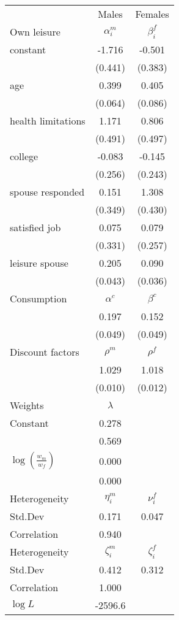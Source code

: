 \begin{tabular}{lcc} 
\hline\hline 
 & Males & Females \\ 
Own leisure & $\alpha_{i}^{m}$ & $\beta_{i}^{f}$ \\ 
constant & -1.716 & -0.501 \\ 
 & (0.441) & (0.383) \\ 
age & 0.399 & 0.405 \\ 
 & (0.064) & (0.086) \\ 
health limitations & 1.171 & 0.806 \\ 
 & (0.491) & (0.497) \\ 
college & -0.083 & -0.145 \\ 
 & (0.256) & (0.243) \\ 
spouse responded & 0.151 & 1.308 \\ 
 & (0.349) & (0.430) \\ 
satisfied job & 0.075 & 0.079 \\ 
 & (0.331) & (0.257) \\ 
leisure spouse & 0.205 & 0.090 \\ 
 & (0.043) & (0.036) \\ 
Consumption & $\alpha^{c}$ & $\beta^{c}$ \\ 
 & 0.197 & 0.152 \\ 
 & (0.049) & (0.049) \\ 
Discount factors & $\rho^m$ & $\rho^f$ \\ 
 & 1.029 & 1.018 \\ 
 & (0.010) & (0.012) \\ 
Weights & $\lambda$ &  \\ 
Constant & 0.278 &  \\ 
 & 0.569 &  \\ 
$\log(\frac{w_m}{w_f})$ & 0.000 &  \\ 
 & 0.000 &  \\ 
Heterogeneity & $\eta_i^m$ & $\nu_i^f$ \\ 
Std.Dev & 0.171 & 0.047 \\ 
Correlation & 0.940 &  \\ 
Heterogeneity & $\zeta_i^m$ & $\zeta_i^f$ \\ 
Std.Dev & 0.412 & 0.312 \\ 
Correlation & 1.000 &  \\ 
\hline 
$\log L$ & -2596.6 & \\ 
\hline \hline 
\end{tabular} 
